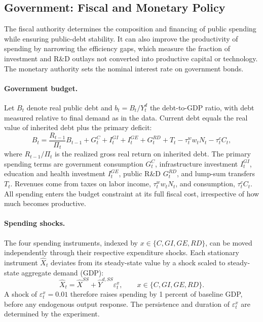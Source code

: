 \documentclass[a4paper,11pt]{article}
\begin{document}
\subsection{Government: Fiscal and Monetary Policy}

The fiscal authority determines the composition and financing of public spending while ensuring public-debt stability.
It can also improve the productivity of spending by narrowing the efficiency gaps, which measure the fraction of investment and R\&D outlays not converted into productive capital or technology.
The monetary authority sets the nominal interest rate on government bonds.

\paragraph{Government budget.}
Let $B_t$ denote real public debt and $b_t=B_t/Y_t^{d}$ the debt-to-GDP ratio, with debt measured relative to final demand as in the data.
Current debt equals the real value of inherited debt plus the primary deficit:
\begin{equation} \label{eq:govbudget}
    B_t = \frac{R_{t-1}}{\Pi_t} B_{t-1} + G_t^{C} + I_t^{GI} + I_t^{GE} + G_t^{RD} + T_t - \tau_t^{w} w_t N_t - \tau_t^{c} C_t,
\end{equation}
where $R_{t-1}/\Pi_t$ is the realized gross real return on inherited debt.
The primary spending terms are government consumption $G_t^C$, infrastructure investment $I_t^{GI}$, education and health investment $I_t^{GE}$, public R\&D $G_t^{RD}$, and lump-sum transfers $T_t$.
Revenues come from taxes on labor income, $\tau_t^w w_tN_t$, and consumption, $\tau_t^cC_t$.
All spending enters the budget constraint at its full fiscal cost, irrespective of how much becomes productive.

\paragraph{Spending shocks.}
The four spending instruments, indexed by $x\in\{C,GI,GE,RD\}$, can be moved independently through their respective expenditure shocks.
Each stationary instrument $\hat{X}_t$ deviates from its steady-state value by a shock scaled to steady-state aggregate demand (GDP):
\begin{equation} \label{eq:spendingrule}
    \hat{X}_t = \hat{X}^{SS} + \hat{Y}^{d,SS}\varepsilon_t^x, \qquad x\in\{C,GI,GE,RD\}.
\end{equation}
A shock of $\varepsilon_t^x=0.01$ therefore raises spending by 1 percent of baseline GDP, before any endogenous output response.
The persistence and duration of $\varepsilon_t^x$ are determined by the experiment.
\end{document}
